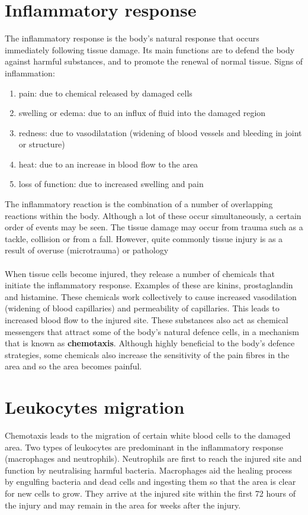 \section{Inflammatory response}
The inflammatory response is the body’s natural response that occurs immediately following tissue damage.
 Its main functions are to defend the body against harmful substances, and to promote the renewal of normal tissue.
Signs of inflammation:
\begin{enumerate}
\item pain: due to chemical released by damaged cells
\item swelling or edema: due to an influx of fluid into the damaged region
\item redness: due to vasodilatation (widening of blood vessels and bleeding in joint or structure)
\item heat: due to an increase in blood flow to the area
\item loss of function: due to increased swelling and pain
\end{enumerate}
\noindent
The inflammatory reaction is the combination of a number of overlapping reactions within the body. 
Although a lot of these occur simultaneously, a certain order of events may be seen.
The tissue damage may occur from trauma such as a tackle, collision or from a fall. 
However, quite commonly tissue injury is as a result of overuse (microtrauma) or pathology
\\
\\
\noindent
When tissue cells become injured, they release a number of chemicals that initiate the inflammatory response. 
Examples of these are kinins, prostaglandin and histamine. 
These chemicals work collectively to cause increased vasodilation (widening of blood capillaries) and permeability of capillaries. 
This leads to increased blood flow to the injured site. 
These substances also act as chemical messengers that attract some of the body’s natural defence cells, in a mechanism that is known as \textbf{chemotaxis}.
Although highly beneficial to the body’s defence strategies, some chemicals also increase the sensitivity of the pain fibres in the area and so the area becomes painful.

\section{Leukocytes migration}
Chemotaxis leads to the migration of certain white blood cells to the damaged area. 
Two types of leukocytes are predominant in the inflammatory response (macrophages and neutrophils). 
Neutrophils are first to reach the injured site and function by neutralising harmful bacteria. Macrophages aid the healing process by engulfing bacteria and dead cells and ingesting them so that the area is clear for new cells to grow. 
They arrive at the injured site within the first 72 hours of the injury and may remain in the area for weeks after the injury.

